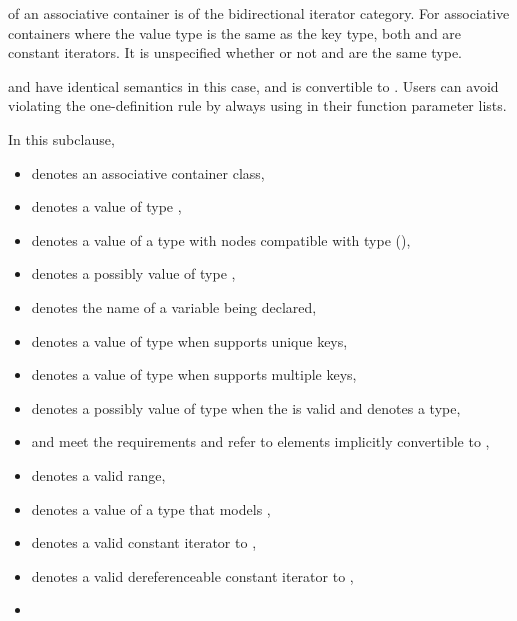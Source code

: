 \pnum
{}
of an associative container is of the bidirectional iterator category.
For associative containers where the value type is the same as the key type, both
and
are constant iterators. It is unspecified whether or not
and
are the same type.
\begin{note}
 and  have identical semantics in this case, and  is convertible to . Users can avoid violating the one-definition rule by always using  in their function parameter lists.
\end{note}

\pnum
In this subclause,
\begin{itemize}
\item
{} denotes an associative container class,
\item
{} denotes a value of type ,
\item
{} denotes a value of a type with nodes compatible with type
 (),
\item
{} denotes a possibly  value of type ,
\item
{} denotes the name of a variable being declared,
\item
{} denotes a value of type 
when  supports unique keys,
\item
{} denotes a value of type 
when  supports multiple keys,
\item
{} denotes a possibly  value of type 
when the 
 is valid
and denotes a type,
\item
{} and 
meet the  requirements and refer to elements
implicitly convertible to
,
\item
{} denotes a valid range,
\item
{} denotes a value of a type 
that models ,
\item
{} denotes a valid constant iterator to ,
\item
{} denotes a valid dereferenceable constant iterator to ,
\item

\end{itemize}
